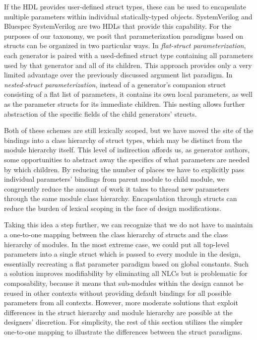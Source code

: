 If the HDL provides user-defined struct types, these can be used to encapsulate multiple parameters within individual statically-typed objects.
SystemVerilog and Bluespec SystemVerilog are two HDLs that provide this capability.
For the purposes of our taxonomy, we posit that parameterization paradigms based on structs can be organized in two particular ways.
In \emph{flat-struct parameterization}, each generator is paired with a used-defined struct type containing all parameters used by that generator and all of its children.
This approach provides only a very limited advantage over the previously discussed argument list paradigm.
In \emph{nested-struct parameterization}, instead of a generator's companion struct consisting of a flat list of parameters,
it contains its own local parameters, as well as the parameter structs for its immediate children. 
This nesting allows further abstraction of the specific fields of the child generators' structs.

Both of these schemes are still lexically scoped, but we have moved the site of the bindings into a class hierarchy of struct types,
which may be distinct from the module hierarchy itself.
This level of indirection affords us, as generator authors, some opportunities to abstract away the specifics of what parameters are needed by which children.
By reducing the number of places we have to explicitly pass individual parameters' bindings from parent module to child module, we congruently reduce
the amount of work it takes to thread new parameters through the same module class hierarchy.
Encapsulation through structs can reduce the burden of lexical scoping in the face of design modifications.

Taking this idea a step further, we can recognize that we do not have to maintain a one-to-one mapping between the class hierarchy of structs and the class hierarchy of modules.
In the most extreme case, we could put all top-level parameters into a single struct which is passed to every module in the design,
essentially recreating a flat parameter paradigm based on global constants.
Such a solution improves modifiability by eliminating all NLCs but is problematic for composability,
because it means that sub-modules within the design cannot be reused in other contexts without providing default bindings for all possible parameters from all contexts.
However, more moderate solutions that exploit differences in the struct hierarchy and module hierarchy are possible at the designers' discretion.
For simplicity, the rest of this section utilizes the simpler one-to-one mapping to illustrate the differences between the struct paradigms.

